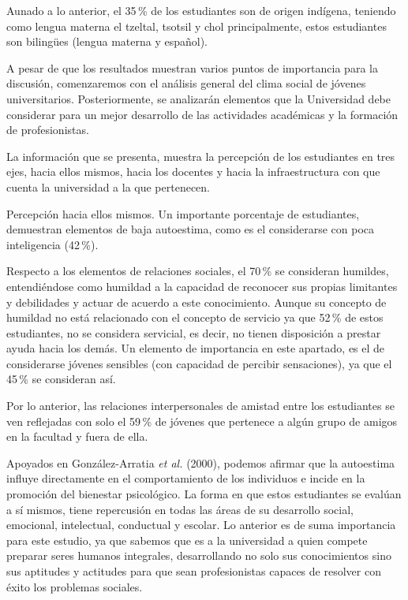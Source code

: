  
Aunado a lo anterior, el 35\,\% de los estudiantes son de origen indígena,
teniendo como lengua materna el tzeltal, tsotsil y chol principalmente,
estos estudiantes son bilingües (lengua materna y español).

 
A pesar de que los resultados muestran varios puntos de importancia para la
discusión, comenzaremos con el análisis general del clima social de jóvenes
universitarios. Posteriormente, se analizarán elementos que la Universidad
debe considerar para un mejor desarrollo de las actividades académicas y la
formación de profesionistas.

 
La información que se presenta, muestra la percepción de los estudiantes en
tres ejes, hacia ellos mismos, hacia los docentes y hacia la
infraestructura con que cuenta la universidad a la que pertenecen.

 
Percepción hacia ellos mismos. Un importante porcentaje de estudiantes,
demuestran elementos de baja autoestima, como es el considerarse con poca
inteligencia (42\,\%).

 
Respecto a los elementos de relaciones sociales, el 70\,\% se consideran
humildes, entendiéndose como humildad a la capacidad de reconocer sus
propias limitantes y debilidades y actuar de acuerdo a este conocimiento.
Aunque su concepto de humildad no está relacionado con el concepto de
servicio ya que 52\,\% de estos estudiantes, no se considera servicial, es
decir, no tienen disposición a prestar ayuda hacia los demás. Un elemento
de importancia en este apartado, es el de considerarse jóvenes sensibles
(con capacidad de percibir sensaciones), ya que el 45\,\% se consideran así.

\enlargethispage{1\baselineskip} 
Por lo anterior, las relaciones interpersonales de amistad entre los
estudiantes se ven reflejadas con solo el 59\,\% de jóvenes que pertenece a
algún grupo de amigos en la facultad y fuera de ella.

 
Apoyados en González-Arratia \textit{et al.} (2000), podemos afirmar que la
autoestima influye directamente en el comportamiento de los individuos e
incide en la promoción del bienestar psicológico. La forma en que estos
estudiantes se evalúan a sí mismos, tiene repercusión en todas las áreas de
su desarrollo social, emocional, intelectual, conductual y escolar. Lo
anterior es de suma importancia para este estudio, ya que sabemos que es a
la universidad a quien compete preparar seres humanos integrales,
desarrollando no solo sus conocimientos sino sus aptitudes y actitudes para
que sean profesionistas capaces de resolver con éxito los problemas
sociales.
\enlargethispage{1\baselineskip}
 
